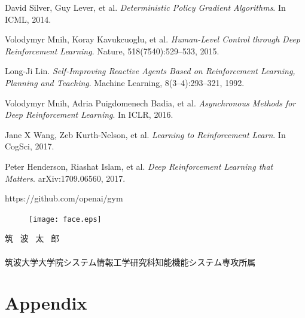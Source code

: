 \documentclass[11pt,twocolumn]{jarticle} %
\begin{document}
\begin{thebibliography}{9}
David Silver, Guy Lever, et al. \textsl{Deterministic Policy Gradient Algorithms}. In ICML, 2014.

Volodymyr Mnih, Koray Kavukcuoglu, et al. \textsl{Human-Level Control through Deep Reinforcement Learning}. Nature, 518(7540):529–533, 2015.

Long-Ji Lin. \textsl{Self-Improving Reactive Agents Based on Reinforcement Learning, Planning and Teaching}. Machine Learning, 8(3–4):293–321, 1992.

Volodymyr Mnih, Adria Puigdomenech Badia, et al. \textsl{Asynchronous Methods for Deep Reinforcement Learning}. In ICLR, 2016.

Jane X Wang, Zeb Kurth-Nelson, et al. \textsl{Learning to Reinforcement Learn}. In CogSci, 2017.

Peter Henderson, Riashat Islam, et al. \textsl{Deep Reinforcement Learning that Matters}. arXiv:1709.06560, 2017.

https://github.com/openai/gym

\vspace{2zh}
\begin{minipage}{73mm}
 \begin{figure} 
 \begin{center}
  \texttt{[image: face.eps]}
 \end{center}
 \end{figure}
 \noindent 筑 \ 波 \ 太 \  郎\\\\
 筑波大学大学院システム情報工学研究科知能機能システム専攻所属
\end{minipage}

\end{thebibliography}
\clearpage
\section{Appendix}
\end{document}
